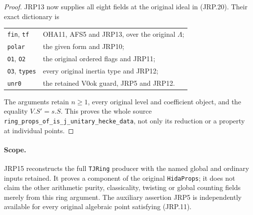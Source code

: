\begin{proof}
JRP13 now supplies all eight fields at the original ideal in
(JRP.20).  Their exact dictionary is
\begin{center}
\begin{tabular}{ll}
\texttt{fin}, \texttt{tf} & OHA11, AFS5 and JRP13, over the original \(\Lambda\);\\
\texttt{polar} & the given form and JRP10;\\
\texttt{O1}, \texttt{O2} & the original ordered flags and JRP11;\\
\texttt{O3}, \texttt{types} & every original inertia type and JRP12;\\
\texttt{unr0} & the retained \(\mathrm{V0ok}\) guard, JRP5 and JRP12.
\end{tabular}
\end{center}
The arguments retain \(n\ge1\), every original level and
coefficient object, and the equality \(V.S'=s.S\).
This proves the whole source
\texttt{ring\_props\_of\_is\_j\_unitary\_hecke\_data},
not only its reduction or a property at individual points.
\end{proof}

\paragraph{Scope.}
JRP15 reconstructs the full \texttt{TJRing} producer with the named
global and ordinary inputs retained.  It proves a component of the
original \texttt{HidaProps}; it does not claim the other arithmetic
purity, classicality, twisting or global counting fields merely from
this ring argument.  The auxiliary assertion JRP5 is independently
available for every original algebraic point satisfying (JRP.11).
